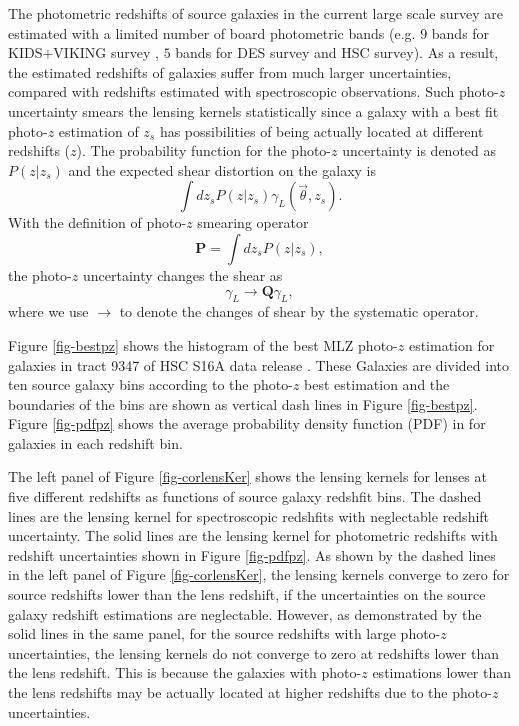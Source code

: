 \documentclass[twocolumn]{aastex62}
\begin{document}
The photometric redshifts of source galaxies in the current large scale survey are estimated with a limited number of
board photometric bands (e.g. $9$ bands for KIDS$+$VIKING survey \citep{KIDS_VIKING-Hildebrant2020}, $5$ bands for DES
survey and HSC survey). As a result, the estimated redshifts of galaxies suffer from much larger uncertainties, compared
with redshifts estimated with spectroscopic observations. Such photo-$z$ uncertainty smears the lensing kernels statistically
since a galaxy with a best fit photo-$z$ estimation of $z_s$ has possibilities of being actually located at different
redshifts ($z$). The probability function for the photo-$z$ uncertainty is denoted as $P(z|z_s)$ and the expected shear
distortion on the galaxy is
\begin{equation}\label{eq-delta2gamma-poz}
\int dz_s P(z|z_s) \gamma_L(\vec{\theta},z_s).
\end{equation}
With the definition of photo-$z$ smearing operator
\begin{equation}
\mathbf{P} = \int dz_s P(z|z_s),
\end{equation}
the photo-$z$ uncertainty changes the shear as
\begin{equation}
\gamma_L \rightarrow \mathbf{Q} \gamma_L,
\end{equation}
where we use $\rightarrow$ to denote the changes of shear by the systematic operator.


Figure \ref{fig-bestpz} shows the histogram of the best MLZ photo-$z$ estimation \cite{HSC1-photoz} for galaxies in tract
9347 of HSC S16A data release \citep{HSC1-data}. These Galaxies are divided into ten source galaxy bins according to the
photo-$z$ best estimation and the boundaries of the bins are shown as vertical dash lines in Figure \ref{fig-bestpz}.
Figure \ref{fig-pdfpz} shows the average probability density function (PDF) in for galaxies in each redshift bin.

The left panel of Figure \ref{fig-corlensKer} shows the lensing kernels for lenses at five different redshifts as functions
of source galaxy redshfit bins. The dashed lines are the lensing kernel for spectroscopic redshfits with neglectable redshift
uncertainty. The solid lines are the lensing kernel for photometric redshifts with redshift uncertainties shown in Figure
\ref{fig-pdfpz}.
As shown by the dashed lines in the left panel of Figure \ref{fig-corlensKer}, the lensing kernels converge to zero for source
redshifts lower than the lens redshift, if the uncertainties on the source galaxy redshift estimations are neglectable. However,
as demonstrated by the solid lines in the same panel, for the source redshifts with large photo-$z$ uncertainties, the lensing
kernels do not converge to zero at redshifts lower than the lens redshift. This is because the galaxies with photo-$z$ estimations
lower than the lens redshifts may be actually located at higher redshifts due to the photo-$z$ uncertainties.
\end{document}
